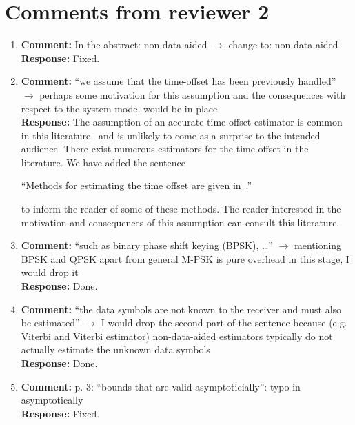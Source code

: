 \documentclass{article}
\begin{document}
\section{Comments from reviewer 2}

\begin{enumerate}

\item \textbf{Comment:} In the abstract: non data-aided $\to$ change to: non-data-aided \\
\textbf{Response:} Fixed.

\item \textbf{Comment:} ``we assume that the time-offset has been previously handled'' $\to$ perhaps some motivation for this assumption and the consequences with respect to the system model would be in place \\
\textbf{Response:}  The assumption of an accurate time offset estimator is common in this literature~\cite{ViterbiViterbi_phase_est_1983,Cowley_ref_sym_carr_1998,Wilson1989,Makrakis1990,Liu1991,Mackenthun1994,Sweldens2001,McKilliamLinearTimeBlockPSK2009,Divsalar1990} and is unlikely to come as a surprise to the intended audience.  There exist numerous estimators for the time offset in the literature.  We have added the sentence 

``Methods for estimating the time offset are given in~\cite{Massey1972optimumframe,Oerder_synch_square_circstat_2008,McKilliam_time_offset_pilots_data_2013}.'' 

to inform the reader of some of these methods.  The reader interested in the motivation and consequences of this assumption can consult this literature.


\item \textbf{Comment:} ``such as binary phase shift keying (BPSK), \dots'' $\to$ mentioning BPSK and QPSK apart from general M-PSK is pure overhead in this stage, I would drop it \\
\textbf{Response:} Done.

\item \textbf{Comment:} ``the data symbols are not known to the receiver and must also be estimated'' $\to$ I would drop the second part of the sentence because (e.g. Viterbi and Viterbi estimator) non-data-aided estimators typically do not actually estimate the unknown data symbols \\
\textbf{Response:} Done.

\item \textbf{Comment:} p. 3: ``bounds that are valid asymptoticially'': typo in asymptotically \\
\textbf{Response:} Fixed.


\end{enumerate}
\end{document}
